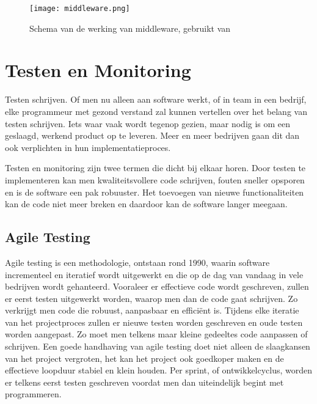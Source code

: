 \begin{figure}[h]
	\texttt{[image: middleware.png]}
	\caption{Schema van de werking van middleware, gebruikt van \cite{middleware}}
	\label{fig:middleware}
\end{figure}

\pagebreak
\section{Testen en Monitoring}
\label{sec:testAndMonitoring}

Testen schrijven. Of men nu alleen aan software werkt, of in team in een bedrijf, elke programmeur met gezond verstand zal kunnen vertellen over het belang van testen schrijven. Iets waar vaak wordt tegenop gezien, maar nodig is om een geslaagd, werkend product op te leveren. Meer en meer bedrijven gaan dit dan ook verplichten in hun implementatieproces. 

Testen en monitoring zijn twee termen die dicht bij elkaar horen. Door testen te implementeren kan men kwaliteitsvollere code schrijven, fouten sneller opsporen en is de software een pak robuuster. Het toevoegen van nieuwe functionaliteiten kan de code niet meer breken en daardoor kan de software langer meegaan. 

\subsection{Agile Testing}
\label{sec:agile}

Agile testing is een methodologie, ontstaan rond 1990, waarin software incrementeel en iteratief wordt uitgewerkt en die op de dag van vandaag in vele bedrijven wordt gehanteerd. Vooraleer er effectieve code wordt geschreven, zullen er eerst testen uitgewerkt worden, waarop men dan de code gaat schrijven. Zo verkrijgt men code die robuust, aanpasbaar en efficiënt is. Tijdens elke iteratie van het projectproces zullen er nieuwe testen worden geschreven en oude testen worden aangepast. Zo moet men telkens maar kleine gedeeltes code aanpassen of schrijven. Een goede handhaving van agile testing doet niet alleen de slaagkansen van het project vergroten, het kan het project ook goedkoper maken en de effectieve loopduur stabiel en klein houden.
Per sprint, of ontwikkelcyclus, worden er telkens eerst testen geschreven voordat men dan uiteindelijk begint met programmeren. \autocite{CHAKRAVORTY2014536}


